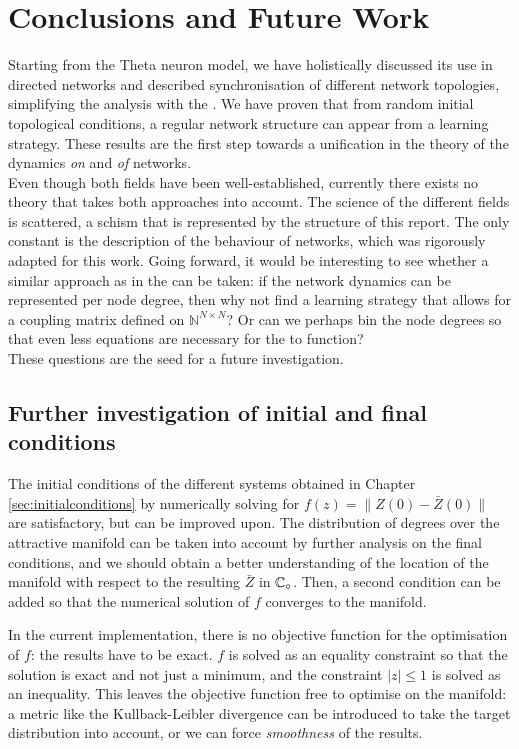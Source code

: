 \newpage
\section{Conclusions and Future Work} \label{sec:ConclusionAndDiscussion}
Starting from the Theta neuron model, we have holistically discussed its use in directed networks and described synchronisation of different network topologies, simplifying the analysis with the \MFR. We have proven that from random initial topological conditions, a regular network structure can appear from a learning strategy. These results are the first step towards a unification in the theory of the dynamics \textsl{on} and \textsl{of} networks. \\

Even though both fields have been well-established, currently there exists no theory that takes both approaches into account. The science of the different fields is scattered, a schism that is represented by the structure of this report. The only constant is the description of the behaviour of networks, which was rigorously adapted for this work. Going forward, it would be interesting to see whether a similar approach as in the \MFR can be taken: if the network dynamics can be represented per node degree, then why not find a learning strategy that allows for a coupling matrix defined on $\mathbb{N}^{N \times N}$? Or can we perhaps bin the node degrees so that even less equations are necessary for the \MFR to function? \\

These questions are the seed for a future investigation.

\subsection{Further investigation of initial and final conditions}
The initial conditions of the different systems obtained in Chapter \ref{sec:initialconditions} by numerically solving for $f(z) = \| Z(0) - \bar{Z}(0) \|$ are satisfactory, but can be improved upon. The distribution of degrees over the attractive manifold can be taken into account by further analysis on the final conditions, and we should obtain a better understanding of the location of the manifold with respect to the resulting $\bar{Z}$ in $\mathbb{C}_\circ$. Then, a second condition can be added so that the numerical solution of $f$ converges to the manifold. 

In the current implementation, there is no objective function for the optimisation of $f$: the results have to be exact. $f$ is solved as an equality constraint so that the solution is exact and not just a minimum, and the constraint $| z | \leq 1$ is solved as an inequality. This leaves the objective function free to optimise on the manifold: a metric like the Kullback-Leibler divergence can be introduced to take the target distribution into account, or we can force \textsl{smoothness} of the results. 


